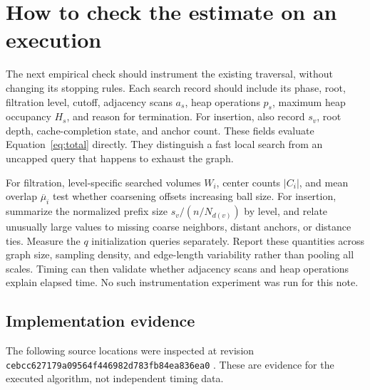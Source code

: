 \documentclass[11pt,a4paper]{article}
\begin{document}
\clearpage
\section{How to check the estimate on an execution}

The next empirical check should instrument the existing traversal, without
changing its stopping rules. Each search record should include its phase,
root, filtration level, cutoff, adjacency scans $a_s$, heap operations $p_s$,
maximum heap occupancy $H_s$, and reason for termination. For insertion,
also record $s_v$, root depth, cache-completion state, and anchor count.
These fields evaluate Equation~\eqref{eq:total} directly. They distinguish a
fast local search from an uncapped query that happens to exhaust the graph.

For filtration, level-specific searched volumes $W_i$, center counts $|C_i|$,
and mean overlap $\overline\mu_i$ test whether coarsening offsets increasing
ball size. For insertion, summarize the normalized prefix size
$s_v/(n/N_{d(v)})$ by level, and relate unusually large values to missing coarse
neighbors, distant anchors, or distance ties. Measure the $q$ initialization
queries separately. Report these quantities across graph size, sampling
density, and edge-length variability rather than pooling all scales. Timing
can then validate whether adjacency scans and heap operations explain elapsed
time. No such instrumentation experiment was run for this note.

\subsection*{Implementation evidence}

The following source locations were inspected at revision
\nolinkurl{cebcc627179a09564f446982d783fb84ea836ea0} \citep{gripcode2026}.
These are evidence for the executed algorithm, not independent timing data.
\end{document}
